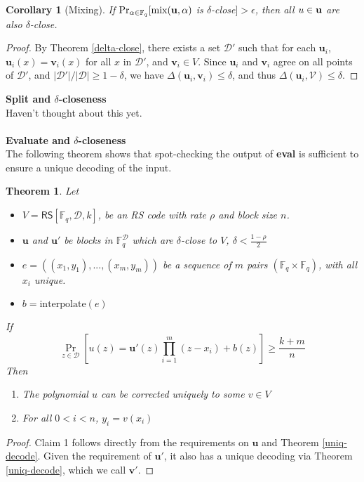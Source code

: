 \documentclass[10pt,letterpaper,titlepage]{article}
\newcommand{\GF}[1]{\mathbb{F}_{#1}}
\newcommand{\p}[0]{\rho}
\newcommand{\dd}[0]{\delta}
\newcommand{\e}[0]{\epsilon}
\newcommand{\D}[0]{\mathcal{D}}
\newtheorem{theorem}{Theorem}
\newtheorem{corollary}{Corollary}
\theoremstyle{definition}
\begin{document}
\begin{appendices}
\begin{corollary}[Mixing]
  If $\Pr_{\alpha \in \GF{q}}[\textrm{mix}(\bold{u}, \alpha)$ is $\dd$-close$] > \e$,
  then all $u \in \bold{u}$ are also $\dd$-close.
\end{corollary}
\begin{proof}
  By Theorem \ref*{delta-close}, there exists a set $\D'$ such that for each $\mathbf{u}_i$, $\mathbf{u}_i(x) = \mathbf{v}_i(x)$ for all $x$ in $\D'$, and $\mathbf{v}_i \in V$.  
  Since $\mathbf{u}_i$ and $\mathbf{v}_i$ agree on all points of $\D'$, and $|\D'|/|\D| \ge 1 - \delta$, we have $\Delta(\mathbf{u}_i, \mathbf{v}_i) \le \dd$, and thus $\Delta(\mathbf{u}_i, \mathcal{V}) \le \dd$.
\end{proof}
\noindent
\textbf{Split and $\delta$-closeness}\\
Haven't thought about this yet.\\
\\
\textbf{Evaluate and $\delta$-closeness}\\
The following theorem shows that spot-checking the output of \textbf{eval} is sufficient to ensure a unique decoding of the input. 
\begin{theorem}
  Let
  \begin{itemize}
    \item $V = \mathsf{RS}[\GF{q}, \D, k]$, be an RS code with rate $\p$ and block size $n$.
    \item $\mathbf{u}$ and $\mathbf{u'}$ be blocks in $\GF{q}^{\D}$ which are $\dd$-close to $V$, $\dd < \frac{1 - \p}{2}$
    \item $e =((x_1, y_1), ..., (x_m, y_m))$ be a sequence of $m$ pairs $(\GF{q} \times \GF{q})$, with all $x_i$ unique.
    \item $b = \textrm{interpolate}(e)$
  \end{itemize}
  If \begin{equation}
    \Pr_{z \in \D}[u(z) = \mathbf{u'}(z) \prod_{i=1}^{m} (z - x_i) + b(z)] \ge \frac{k+m}{n}
  \end{equation}
  Then
  \begin{enumerate}
    \item The polynomial $u$ can be corrected uniquely to some $v \in V$
    \item For all $0 < i < n$, $y_i = v(x_i)$
  \end{enumerate}
\end{theorem}
\begin{proof}
  Claim 1 follows directly from the requirements on $\mathbf{u}$ and Theorem \ref{uniq-decode}.
  Given the requirement of $\mathbf{u'}$, it also has a unique decoding via Theorem \ref{uniq-decode}, which we call $\mathbf{v'}$.


\end{proof}
\end{appendices}
\end{document}

